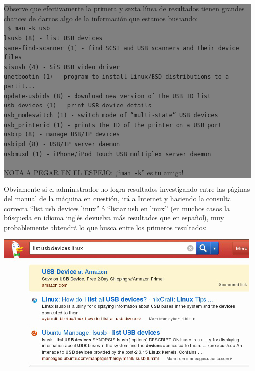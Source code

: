 \documentclass[12pt]{article}
\begin{document}
\colorbox{grey}{\parbox[t]{0.95\linewidth}{ \vspace*{0.5cm} { 
Observe que efectivamente la primera y sexta línea de resultados tienen grandes chances 
de darnos algo de la información que estamos buscando: \\ 
{\tt 
\$ man -k usb \\
lsusb (8)            - list USB devices\\
sane-find-scanner (1) - find SCSI and USB scanners and their device files\\
sisusb (4)           - SiS USB video driver\\
unetbootin (1)       - program to install Linux/BSD distributions to a partit...\\
update-usbids (8)    - download new version of the USB ID list\\
usb-devices (1)      - print USB device details\\
usb\_modeswitch (1)   - switch mode of ``multi-state'' USB devices\\
usb\_printerid (1)    - prints the ID of the printer on a USB port\\
usbip (8)            - manage USB/IP devices\\
usbipd (8)           - USB/IP server daemon\\
usbmuxd (1)          - iPhone/iPod Touch USB multiplex server daemon\\ \\
}
NOTA A PEGAR EN EL ESPEJO: ¡``{\tt man -k}'' es tu amigo!
} \vspace*{0.5cm} } } 

Obviamente si el administrador no logra resultados investigando entre las 
páginas del manual de la máquina en cuestión, irá a Internet y haciendo la consulta
correcta ``list usb devices linux'' ó ``listar usb en linux'' (en 
muchos casos la búsqueda en idioma inglés devuelva más resultados que en español),  
muy probablemente obtendrá lo que busca entre los primeros resultados: 

\begin{center}
 \includegraphics{lsusb.jpg}
\end{center}
\end{document}
